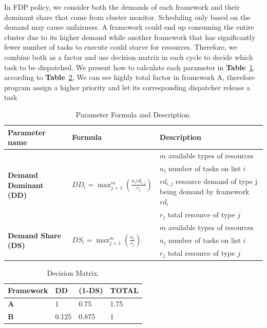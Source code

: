 \documentclass[12pt,oneside,openright,a4paper]{cpe-english-project}
\begin{document}
\begin{enumerate}
\hspace{10mm}In FDP policy, we consider both the demands of each framework and their dominant share that come from cluster monitor. Scheduling only based on the demand may cause unfairness. A framework could end up consuming the entire cluster due to its higher demand while another framework that has significantly fewer number of tasks to execute could starve for resources. Therefore, we combine both as a factor and use decision matrix in each cycle to decide which task to be dispatched. We present how to calculate each parameter in \textbf{Table}~\ref{tbl:Parameter}. according to \textbf{Table}~\ref{tbl:DecisionMatrix}, We can see highly total factor in framework A, therefore program assign a higher priority and let its corresponding dispatcher release a task

  \begin{table}[!h]
    \caption{Parameter Formula and Description.}\label{tbl:Parameter}
    \begin{tabular}{@{}|p{}|p{}|p{}|}
      \hline
      \textbf{Parameter name} & \textbf{Formula} & \textbf{Description} \\ 
      \hline
      \multirow{4}{*}{\textbf{Demand Dominant (DD)}} & \multirow{4}{*}{$DD_i = \max_{j=1}^{m}(\frac{n_ird_{i,j}}{r_j})$} & $m$ available types of resources\\ 
      \cline{3-3} & & $n_i$ number of tasks on list $i$\\ 
      \cline{3-3} & & $rd_{i,j}$ resource demand of type j being demand by framework $rd_i $\\ 
      \cline{3-3} & & $r_j$ total resource of type $j$\\ 
      \hline
      \multirow{3}{*}{\textbf{Demand Share (DS)}} & \multirow{3}{*}{$DS_i = \max_{j=1}^{m}(\frac{n_i}{r_j})$} & $m$ available types of resources \\ 
      \cline{3-3} & & $n_i$ number of tasks on list $i$ \\
      \cline{3-3} & & $r_j$ total resource of type $j$ \\ 
      \hline
    \end{tabular}
  \end{table}

  \begin{table}[!h]
    \caption{Decision Matrix.}\label{tbl:DecisionMatrix}
      \begin{tabular}{@{}|p{}|p{}|p{}|p{}|}
      \hline
      \textbf{Framework} & \textbf{DD} & \textbf{(1-DS)} & \textbf{TOTAL}\\
      \hline
      \textbf{A} & 1 & 0.75 & 1.75\\
      \hline
      \textbf{B} & 0.125 & 0.875 & 1\\
      \hline
    \end{tabular}
  \end{table}
  

\end{enumerate}
\end{document}
